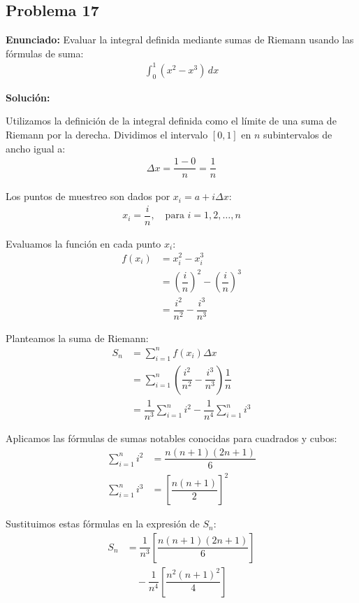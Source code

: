 \subsection*{Problema 17}

\textbf{Enunciado:} Evaluar la integral definida 
mediante sumas de Riemann usando las 
fórmulas de suma:
\begin{align*}
\int_{0}^{1} (x^2 - x^3) \, dx
\end{align*}

\textbf{Solución:} 

Utilizamos la definición de la integral 
definida como el límite de una suma de 
Riemann por la derecha. Dividimos el 
intervalo $[0, 1]$ en $n$ subintervalos de 
ancho igual a:
\begin{align*}
\Delta x = \dfrac{1 - 0}{n} = \dfrac{1}{n}
\end{align*}

Los puntos de muestreo son dados por 
$x_i = a + i \Delta x$:
\begin{align*}
x_i = \dfrac{i}{n}, \quad \text{para } i = 1, 2, \dots, n
\end{align*}

Evaluamos la función en cada punto $x_i$:
\begin{align*}
f(x_i) &= x_i^2 - x_i^3 \\
&= \left(\dfrac{i}{n}\right)^2 - 
\left(\dfrac{i}{n}\right)^3 \\
&= \dfrac{i^2}{n^2} - \dfrac{i^3}{n^3}
\end{align*}

Planteamos la suma de Riemann:
\begin{align*}
S_n &= \sum_{i=1}^{n} f(x_i) \Delta x \\
&= \sum_{i=1}^{n} \left( \dfrac{i^2}{n^2} - 
\dfrac{i^3}{n^3} \right) \dfrac{1}{n} \\
&= \dfrac{1}{n^3} \sum_{i=1}^{n} i^2 - 
\dfrac{1}{n^4} \sum_{i=1}^{n} i^3
\end{align*}

Aplicamos las fórmulas de sumas notables 
conocidas para cuadrados y cubos:
\begin{align*}
\sum_{i=1}^{n} i^2 &= \dfrac{n(n+1)(2n+1)}{6} \\
\sum_{i=1}^{n} i^3 &= \left[\dfrac{n(n+1)}{2}\right]^2
\end{align*}

Sustituimos estas fórmulas en la expresión 
de $S_n$:
\begin{align*}
S_n &= \dfrac{1}{n^3} \left[ \dfrac{n(n+1)(2n+1)}{6} \right] \\
&\quad - \dfrac{1}{n^4} \left[ \dfrac{n^2(n+1)^2}{4} \right]
\end{align*}

